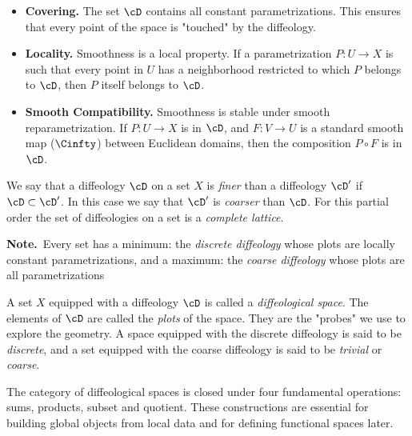 \begin{itemize}
  \item[D1.]\textbf{Covering.}
  The set $\cD$ contains all constant parametrizations.
  This ensures that every point of the space is "touched" by the diffeology.
  \item[D2.] \textbf{Locality.}
  Smoothness is a local property.
  If a parametrization $P: U \to X$ is such that every point in $U$ has a neighborhood restricted to which $P$ belongs to $\cD$,
  then $P$ itself belongs to $\cD$.
  \item[D3.] \textbf{Smooth Compatibility.}
  Smoothness is stable under smooth re\-pa\-ra\-me\-tri\-za\-tion.
  If $P: U \to X$ is in $\cD$,
  and $F: V \to U$ is a standard smooth map ($\Cinfty$) between Euclidean domains,
  then the composition $P \circ F$ is in $\cD$.
\end{itemize}

\begin{article}
  We say that a diffeology $\cD$ on a set $X$ is \emph{finer} than a diffeology $\cD'$ if $\cD \subset \cD'$.
  In this case we say that $\cD'$ is \emph{coarser} than $\cD$.
  For this partial order the set of diffeologies on a set is a \emph{complete lattice}.
  
  \textbf{Note.}~Every set has a minimum: the \emph{discrete diffeology} whose plots are locally constant parametrizations,
  and a maximum: the \emph{coarse diffeology} whose plots are all parametrizations
\end{article}

\begin{article}
  A set $X$ equipped with a diffeology $\cD$ is called a \emph{diffeological space}.
  The elements of $\cD$ are called the \emph{plots} of the space.
  They are the "probes" we use to explore the geometry.
  A space equipped with the discrete diffeology is said to be \emph{discrete},
  and a set equipped with the coarse diffeology is said to be \emph{trivial} or \emph{coarse}.
\end{article}

The category of diffeological spaces is closed under four fundamental operations:
sums,
products, subset and quotient.
These constructions are essential for building global objects from
local data and for defining functional spaces later.

